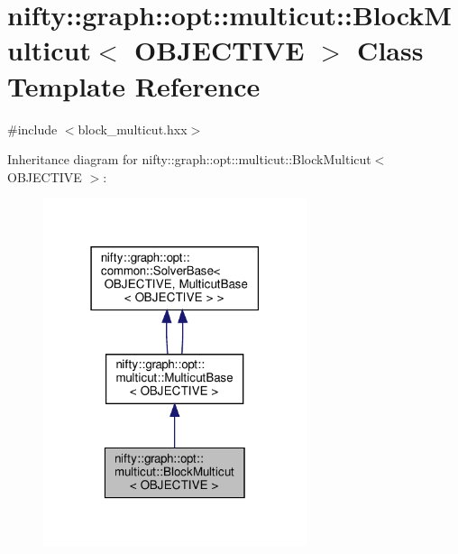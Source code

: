 \hypertarget{classnifty_1_1graph_1_1opt_1_1multicut_1_1BlockMulticut}{}\section{nifty\+:\+:graph\+:\+:opt\+:\+:multicut\+:\+:Block\+Multicut$<$ O\+B\+J\+E\+C\+T\+I\+VE $>$ Class Template Reference}
\label{classnifty_1_1graph_1_1opt_1_1multicut_1_1BlockMulticut}


{\ttfamily \#include $<$block\+\_\+multicut.\+hxx$>$}



Inheritance diagram for nifty\+:\+:graph\+:\+:opt\+:\+:multicut\+:\+:Block\+Multicut$<$ O\+B\+J\+E\+C\+T\+I\+VE $>$\+:
\nopagebreak
\begin{figure}[H]
\begin{center}
\leavevmode
\includegraphics[width=219pt]{classnifty_1_1graph_1_1opt_1_1multicut_1_1BlockMulticut__inherit__graph}
\end{center}
\end{figure}


